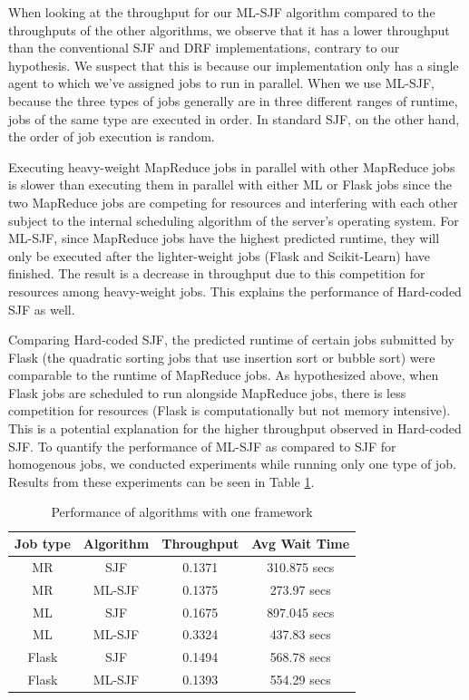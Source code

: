 \documentclass{hotnets19}
\begin{document}
\vspace{0.3cm}

When looking at the throughput for our ML-SJF algorithm compared to the throughputs of the other algorithms, we observe that it has a lower throughput than the conventional SJF and DRF implementations, contrary to our hypothesis.
We suspect that this is because our implementation only has a single agent to which we've assigned jobs to run in parallel.
When we use ML-SJF, because the three types of jobs generally are in three different ranges of runtime, jobs of the same type are executed in order.
In standard SJF, on the other hand, the order of job execution is random.

Executing heavy-weight MapReduce jobs in parallel with other MapReduce jobs is slower than executing them in parallel with either ML or Flask jobs since the two MapReduce jobs are competing for resources and interfering with each other subject to the internal scheduling algorithm of the server's operating system.
For ML-SJF, since MapReduce jobs have the highest predicted runtime, they will only be executed after the lighter-weight jobs (Flask and Scikit-Learn) have finished. The result is a decrease in throughput due to this competition for resources among heavy-weight jobs. This explains the performance of Hard-coded SJF as well. 

Comparing Hard-coded SJF, the predicted runtime of certain jobs submitted by Flask (the quadratic sorting jobs that use insertion sort or bubble sort) were comparable to the runtime of MapReduce jobs. 
As hypothesized above, when Flask jobs are scheduled to run alongside MapReduce jobs, there is less competition for resources (Flask is computationally but not memory intensive). This is a potential explanation for the higher throughput observed in Hard-coded SJF.
To quantify the performance of ML-SJF as compared to SJF for homogenous jobs, we conducted experiments while running only one type of job.
Results from these experiments can be seen in Table \ref{individual-jobs}.

\begin{table}[h]
\begin{tabular}{|c|c|c|c|}
\hline
    \textbf{Job type} & \textbf{Algorithm} & \textbf{Throughput} & \textbf{Avg Wait Time} \\\hline
    MR & SJF & 0.1371 & 310.875 secs \\\hline
    MR & ML-SJF & 0.1375 & 273.97 secs \\\hline
    ML & SJF & 0.1675 & 897.045 secs \\\hline
    ML & ML-SJF & 0.3324 & 437.83 secs \\\hline
    Flask & SJF & 0.1494  & 568.78 secs \\\hline
    Flask & ML-SJF & 0.1393  & 554.29 secs \\\hline
\end{tabular}
\caption{Performance of algorithms with one framework}
\label{individual-jobs}
\end{table}
\end{document}

